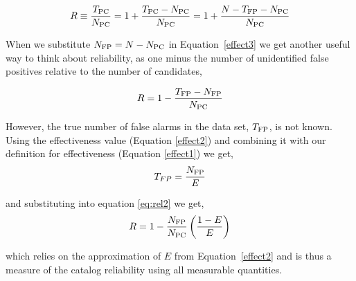 \begin{equation}
\label{effect3}
R \equiv \frac{T_{\rm PC}}{N_{\rm PC}} =  1 + \frac{T_{\rm PC}-N_{\rm PC}}{N_{\rm PC}} 
= 1 + \frac{N - T_{\rm FP} - N_{\rm PC}}{N_{\rm PC}}
\end{equation}

\noindent When we substitute $N_{{\rm FP}}=N-N_{{\rm PC}}$ in Equation~\ref{effect3} we get another useful way to think about reliability, as one minus the number of unidentified false positives relative to the number of candidates,

\begin{equation}
\label{eq:rel2}
R = 1 - \frac{T_{\rm FP}-N_{\rm FP}}{N_{\rm PC}}
\end{equation}

\noindent However, the true number of false alarms in the \opstce{} data set, $T_{\rm FP}$, is not known. Using the effectiveness value (Equation \ref{effect2}) and combining it with our definition for effectiveness (Equation \ref{effect1}) we get,
\begin{equation}
T_{FP} = \frac{N_{\rm FP}}{E} 
\end{equation}

\noindent and substituting into equation \ref{eq:rel2} we get,
\textbf{
\begin{equation}
R= 1 - \frac{N_{\rm FP}}{N_{\rm PC}}\left(\frac{1-E}{E}\right)
\end{equation}
}

\noindent which relies on the approximation of $E$ from Equation~\ref{effect2} and is thus a measure of the catalog reliability using all measurable quantities.




